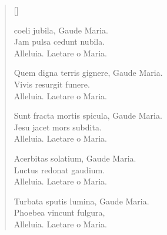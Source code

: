 \newHymn


\begin{verse}[\versewidth]

 coeli jubila, Gaude Maria.\\
Jam pulsa cedunt nubila.\\
Alleluia. Laetare o Maria.

 Quem digna terris gignere, Gaude Maria.\\
Vivis resurgit funere.\\
Alleluia. Laetare o Maria.

 Sunt fracta mortis spicula, Gaude Maria.\\
Jesu jacet mors subdita.\\
Alleluia. Laetare o Maria.

 Acerbitas solatium, Gaude Maria.\\
Luctus redonat gaudium.\\
Alleluia. Laetare o Maria.

 Turbata sputis lumina, Gaude Maria.\\
Phoebea vincunt fulgura,\\
Alleluia. Laetare o Maria.






\end{verse}
